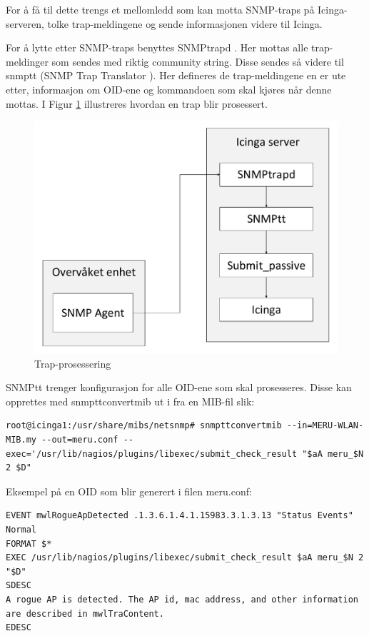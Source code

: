 For å få til dette trengs et mellomledd som kan motta SNMP-traps på Icinga-serveren, tolke trap-meldingene og sende informasjonen videre til Icinga. 

For å lytte etter SNMP-traps benyttes SNMPtrapd \cite{snmptraps2}. Her mottas alle trap-meldinger som sendes med riktig community string. Disse sendes så videre til snmptt (SNMP Trap Translator \cite{traptranselator}). Her defineres de trap-meldingene en er ute etter, informasjon om OID-ene og kommandoen som skal kjøres når denne mottas. I Figur \ref{snmptrap} illustreres hvordan en trap blir prosessert. 

\begin{figure}[H]
    \centering
    \includegraphics[scale=0.4]{img/SNMPtrap}
    \caption{Trap-prosessering}
    \label{snmptrap}
\end{figure}

SNMPtt trenger konfigurasjon for alle OID-ene som skal prosesseres. Disse kan opprettes med snmpttconvertmib ut i fra en MIB-fil slik:

\begin{lstlisting}[style=example]
root@icinga1:/usr/share/mibs/netsnmp# snmpttconvertmib --in=MERU-WLAN-MIB.my --out=meru.conf --exec='/usr/lib/nagios/plugins/libexec/submit_check_result "$aA meru_$N 2 $D"
\end{lstlisting}

Eksempel på en OID som blir generert i filen meru.conf:

\begin{lstlisting}[style=example]
EVENT mwlRogueApDetected .1.3.6.1.4.1.15983.3.1.3.13 "Status Events" Normal
FORMAT $*
EXEC /usr/lib/nagios/plugins/libexec/submit_check_result $aA meru_$N 2 "$D"
SDESC
A rogue AP is detected. The AP id, mac address, and other information are described in mwlTraContent.
EDESC
\end{lstlisting}

